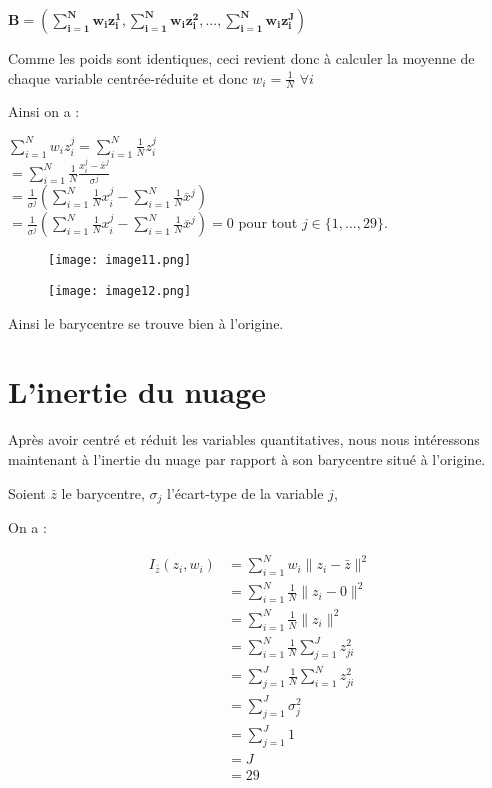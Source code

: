 \documentclass{article}
\begin{document}
$\mathbf{B=(\sum_{i=1}^{N}w_{i}z_{i}^{1},\sum_{i=1}^{N}w_{i}z_{i}^{2},...,\sum_{i=1}^{N}w_{i}z_{i}^{J})}$ 

Comme les poids sont identiques, ceci revient donc à calculer la moyenne de chaque variable centrée-réduite et donc $w_i=\frac{1}{N}$ $\forall i$

Ainsi on a : 

\begin{center}
$\sum_{i=1}^{N}w_{i}z_{i}^{j} = \sum_{i=1}^{N}\frac{1}{N}z_{i}^{j}$ \\
$=\sum_{i=1}^{N}\frac{1}{N} \frac{x_{i}^{j}-\overline{x}^{j}}{\sigma^{j}}$ \\
$=\frac{1}{\sigma^{j}}\left(\sum_{i=1}^{N}\frac{1}{N}x_{i}^{j}-\sum_{i=1}^{N}\frac{1}{N}\overline{x}^{j}\right)$ \\ 
$=\frac{1}{\sigma^{j}}\left(\sum_{i=1}^{N}\frac{1}{N}x_{i}^{j}-\sum_{i=1}^{N}\frac{1}{N}\overline{x}^{j}\right) = 0$ pour tout \(j \in \{1, \ldots, 29\}\).
\end{center}


\begin{figure}[h]
    \centering
    \texttt{[image: image11.png]}
    \label{fig:enter-label}
\end{figure}

\begin{figure}[h]
    \centering
    \texttt{[image: image12.png]}
    \label{fig:enter-label}
\end{figure}
Ainsi le barycentre se trouve bien à l'origine. 


\section{L'inertie du nuage}

Après avoir centré et réduit les variables quantitatives, nous nous intéressons maintenant à l'inertie du nuage par rapport à son barycentre situé à l'origine.

Soient $\bar{z}$ le barycentre, $\sigma_j$ l'écart-type de la variable $j$,

On a :
\begin{center}
\begin{align*}
I_{\bar{z}}(z_i, w_i) &= \sum_{i=1}^N w_i\|z_i - \bar{z}\|^2 \\
&= \sum_{i=1}^N \frac{1}{N}\|z_i - 0\|^2 \\
&= \sum_{i=1}^N \frac{1}{N}\|z_i\|^2 \\
&= \sum_{i=1}^N \frac{1}{N}\sum_{j=1}^J z_{ji}^2 \\
&= \sum_{j=1}^J \frac{1}{N}\sum_{i=1}^N z_{ji}^2 \\
&= \sum_{j=1}^J \sigma_j^2 \\
&= \sum_{j=1}^J 1 \\
&= J \\
&= 29
\end{align*}
\end{center}
\end{document}
